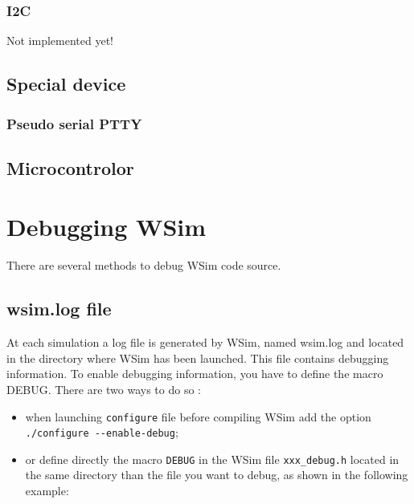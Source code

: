 \documentclass[a4paper,10pt]{report}
\begin{document}
\subsection{I2C}
Not implemented yet!

\section{Special device}
\subsection{Pseudo serial PTTY}


\section{Microcontrolor}


\chapter{Debugging WSim}

There are several methods to debug WSim code source.

\section{wsim.log file}

At each simulation a log file is generated by WSim, named wsim.log and located in the directory where WSim has been launched. This file contains debugging information.
To enable debugging information, you have to define the macro DEBUG. There are two ways to do so :

\begin{itemize}
  \item when launching \verb$configure$ file before compiling WSim add the option \verb$./configure --enable-debug$;
  \item or define directly the macro \verb$DEBUG$ in the WSim file \verb$xxx_debug.h$ located in the same directory than the file you want to debug, as shown in the following example:
\end{itemize}
\end{document}
